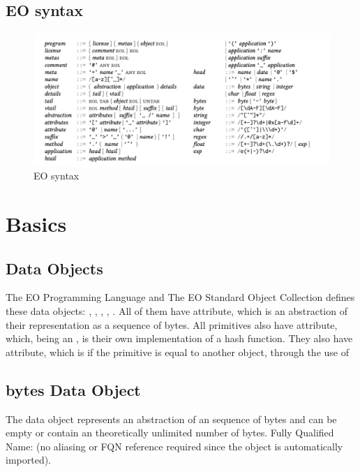 \documentclass[12pt]{book}
\begin{document}
{\section{EO syntax}
\begin{figure}[ht]
  \centering
  \includegraphics[width=1\textwidth,]{EOsyntxax.jpg}
  \caption{EO syntax}
  \label{fig:uml1}
\end{figure}


\chapter{Basics} \label{chapter:basics}

\section{Data Objects}

The EO Programming Language and The EO Standard Object Collection defines these data objects: , , , , . All of them have  attribute, which is an abstraction of their representation as a sequence of bytes.
All primitives also have  attribute, which, being an , is their own implementation of a hash function. They also have  attribute, which is  if the primitive is equal to another object, through the use of 

\section{bytes Data Object}
The  data object represents an abstraction of an sequence of bytes and can be empty or contain an theoretically unlimited number of bytes.
Fully Qualified Name:  (no aliasing or FQN reference required since the object is automatically imported).

}
\end{document}
